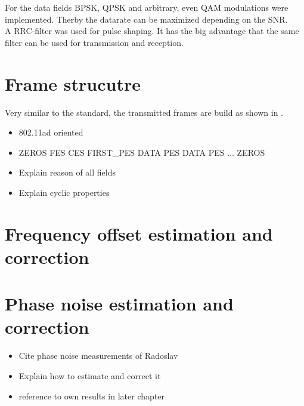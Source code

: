 For the data fields \gls{BPSK}, \gls{QPSK} and arbitrary, even
\gls{QAM} modulations were implemented. Therby the datarate
can be maximized depending on the \gls{SNR}. \\

A \gls{RRC}-filter was used for pulse shaping. It has the big advantage that
the same filter can be used for transmission and reception. \\

\section{Frame strucutre}
\label{sec:sys_frame_struct}

Very similar to the standard, the transmitted frames are build as shown in
.



\begin{itemize}
\item 802.11ad oriented
\item ZEROS FES CES FIRST\_PES DATA PES DATA PES ... ZEROS
\item Explain reason of all fields
\item Explain cyclic properties
\end{itemize}

\section{Frequency offset estimation and correction}

\section{Phase noise estimation and correction}
\begin{itemize}
\item Cite phase noise measurements of Radoslav
\item Explain how to estimate and correct it
\item reference to own results in later chapter
\end{itemize}

